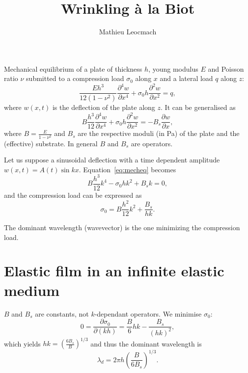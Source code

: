 \documentclass[12pt,a4paper]{revtex4}
\begin{document}
\author{Mathieu Leocmach}
\title{Wrinkling à la Biot}
\maketitle

Mechanical equilibrium of a plate of thickness $h$, young modulus $E$ and Poisson ratio $\nu$ submitted to a compression load $\sigma_0$ along $x$ and a lateral load $q$ along $z$:
\begin{equation}
\frac{E h^3}{12(1-\nu^2)}\frac{\partial^4 w}{\partial x^4} + \sigma_0 h \frac{\partial^2 w}{\partial x^2} = q,
\end{equation}
where $w(x,t)$ is the deflection of the plate along $z$. It can be generalised as
\begin{equation}
B\frac{h^3}{12}\frac{\partial^4 w}{\partial x^4} + \sigma_0 h \frac{\partial^2 w}{\partial x^2} = -B_s \frac{\partial w}{\partial x},
\label{eq:mecheq}
\end{equation}
where $B=\frac{E}{1-\nu^2}$ and $B_s$ are the respective moduli (in \si{\pascal}) of the plate and the (effective) substrate. In general $B$ and $B_s$ are operators.

Let us suppose a sinusoidal deflection with a time dependent amplitude $w(x,t) = A(t) \sin kx$. Equation~\ref{eq:mecheq} becomes
\begin{equation}
B\frac{h^3}{12}k^4 - \sigma_0 h k^2 + B_s k =0,
\end{equation}
and the compression load can be expressed as
\begin{equation}
\sigma_0 = B \frac{h^2}{12} k^2 + \frac{B_s}{hk}.
\label{eq:sigma0}
\end{equation}

The dominant wavelength (wavevector) is the one minimizing the compression load.

\section{Elastic film in an infinite elastic medium}

$B$ and $B_s$ are constants, not $k$-dependant operators. We minimise $\sigma_0$:
\begin{equation}
0 = \frac{\partial \sigma_0}{\partial (kh)} = \frac{B}{6} hk -  \frac{B_s}{(hk)^2},
\end{equation}
which yields $hk = \left(\frac{6B_s}{B}\right)^{1/3}$ and thus the dominant wavelength is
\begin{equation}
\lambda_d = 2\pi h \left(\frac{B}{6B_s}\right)^{1/3}.
\label{eq:lambdaElEl}
\end{equation}
\end{document}
